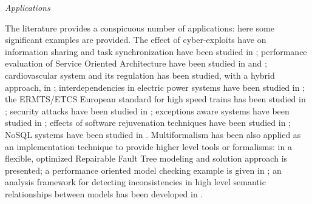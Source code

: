 \emph{Applications}

The literature provides a conspicuous number of applications: here some
significant examples are provided. The effect of cyber-exploits have on information sharing
and task synchronization have been studied in \cite{Levis2014541}; performance
evaluation of Service Oriented Architecture have been studied in
\cite{Abusharekh2016614} and \cite{JTIT2014WS}; cardiovascular system and its
regulation has been studied, with a hybrid approach, in
\cite{Hernandez20094923}; interdependencies in electric power systems have been
studied in \cite{Chiaradonna2007185}; the ERMTS/ETCS European standard for high
speed trains has been studied in \cite{ERTMS1014}; security attacks have been
studied in \cite{ENTCS2015BN}; exceptions aware systems have been studied in
\cite{ASMTA2011}; effects of software rejuvenation techniques have been studied
in \cite{ISSRE2012}; NoSQL systems have been studied in \cite{FGCS2014NoSQL}.
Multiformalism has been also applied as an implementation technique to provide
higher level tools or formalisms: in \cite{DSN2004} a flexible, optimized
Repairable Fault Tree modeling and solution approach is presented; a performance
oriented model checking example is given in \cite{VT2011}; an analysis framework
for detecting inconsistencies in high level semantic relationships between
models has been developed in \cite{Qamar201584}.
